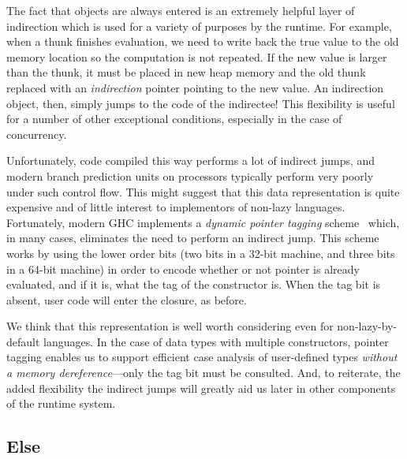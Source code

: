 

The fact that objects are always entered is an extremely helpful layer
of indirection which is used for a variety of purposes by the runtime.
For example, when a thunk finishes evaluation, we need to write back the
true value to the old memory location so the computation is not
repeated.  If the new value is larger than the thunk, it must be placed
in new heap memory and the old thunk replaced with an \emph{indirection}
pointer pointing to the new value.  An indirection object, then, simply
jumps to the code of the indirectee!  This flexibility is useful for a
number of other exceptional conditions, especially in the case of
concurrency.

Unfortunately, code compiled this way performs a lot of indirect jumps,
and modern branch prediction units on processors typically perform very
poorly under such control flow.  This might suggest that this data
representation is quite expensive and of little interest to implementors
of non-lazy languages.  Fortunately, modern GHC implements a
\emph{dynamic pointer tagging} scheme~\XXX{} which, in many cases,
eliminates the need to perform an indirect jump.  This scheme works by
using the lower order bits (two bits in a 32-bit machine, and three bits
in a 64-bit machine) in order to encode whether or not pointer is
already evaluated, and if it is, what the tag of the constructor is.
When the tag bit is absent, user code will enter the closure, as before.

We think that this representation is well worth considering even for
non-lazy-by-default languages.  In the case of data types with multiple
constructors, pointer tagging enables us to support efficient case
analysis of user-defined types \emph{without a memory
dereference}---only the tag bit must be consulted.  And, to reiterate,
the added flexibility the indirect jumps will greatly aid us later in
other components of the runtime system.


\subsection{Else}


